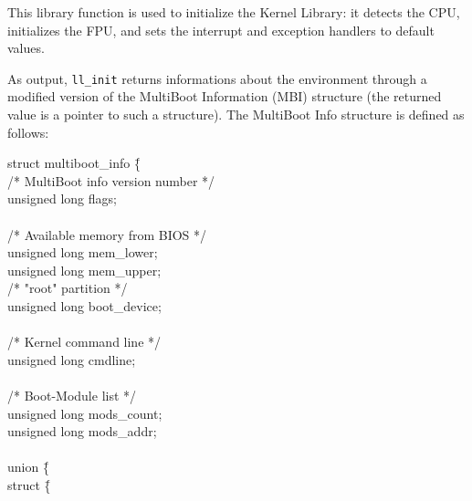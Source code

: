 \documentclass[a4paper]{report}
\begin{document}
This library function is used to initialize the Kernel Library: it
detects the CPU, initializes the FPU, and sets the interrupt and
exception handlers to default values.

As output, {\tt ll\_init} returns informations about the environment
through a modified version of the MultiBoot Information (MBI)
structure (the returned value is a pointer to such a structure). The
MultiBoot Info structure is defined as follows:

\begin{minipage}[t]{15cm}
\begin{tt}
\begin{tabbing}
struct multiboot\_info \= \{                                            \\
/* MultiBoot info version number */                                     \\
\>      unsigned long flags;                                            \\
									\\
/* Available memory from BIOS */                                        \\
\>      unsigned long mem\_lower;                                       \\
\>      unsigned long mem\_upper;                                       \\
/* "root" partition */                                                  \\
\>      unsigned long boot\_device;                                     \\
									\\
/* Kernel command line */                                               \\
\>      unsigned long cmdline;                                          \\
									\\
/* Boot-Module list */                                                  \\
\>      unsigned long mods\_count;                                      \\
\>      unsigned long mods\_addr;                                       \\
									\\
\>      union \= \{                                                     \\
\>      \>      struct \= \{                                            \\

\end{tabbing}
\end{tt}
\end{minipage}
\end{document}
